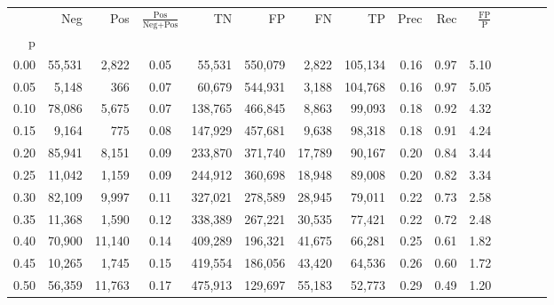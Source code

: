 \begin{tabular}{rrrcrrrrrrrrrrr}
\toprule
{} &     Neg &     Pos & $\frac{\text{Pos}}{\text{Neg}+\text{Pos}}$ &       TN &       FP &       FN &       TP &  Prec &   Rec & $\frac{\text{FP}}{\text{P}}$ \\
p    &         &         &                                            &          &          &          &          &       &       &                              \\
\midrule
0.00 &  55,531 &   2,822 &                                       0.05 &   55,531 &  550,079 &    2,822 &  105,134 &  0.16 &  0.97 &                         5.10 \\
0.05 &   5,148 &     366 &                                       0.07 &   60,679 &  544,931 &    3,188 &  104,768 &  0.16 &  0.97 &                         5.05 \\
0.10 &  78,086 &   5,675 &                                       0.07 &  138,765 &  466,845 &    8,863 &   99,093 &  0.18 &  0.92 &                         4.32 \\
0.15 &   9,164 &     775 &                                       0.08 &  147,929 &  457,681 &    9,638 &   98,318 &  0.18 &  0.91 &                         4.24 \\
0.20 &  85,941 &   8,151 &                                       0.09 &  233,870 &  371,740 &   17,789 &   90,167 &  0.20 &  0.84 &                         3.44 \\
0.25 &  11,042 &   1,159 &                                       0.09 &  244,912 &  360,698 &   18,948 &   89,008 &  0.20 &  0.82 &                         3.34 \\
0.30 &  82,109 &   9,997 &                                       0.11 &  327,021 &  278,589 &   28,945 &   79,011 &  0.22 &  0.73 &                         2.58 \\
0.35 &  11,368 &   1,590 &                                       0.12 &  338,389 &  267,221 &   30,535 &   77,421 &  0.22 &  0.72 &                         2.48 \\
0.40 &  70,900 &  11,140 &                                       0.14 &  409,289 &  196,321 &   41,675 &   66,281 &  0.25 &  0.61 &                         1.82 \\
0.45 &  10,265 &   1,745 &                                       0.15 &  419,554 &  186,056 &   43,420 &   64,536 &  0.26 &  0.60 &                         1.72 \\
0.50 &  56,359 &  11,763 &                                       0.17 &  475,913 &  129,697 &   55,183 &   52,773 &  0.29 &  0.49 &                         1.20 \\

\end{tabular}
